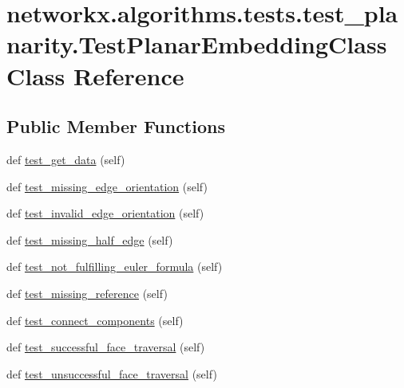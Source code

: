 \hypertarget{classnetworkx_1_1algorithms_1_1tests_1_1test__planarity_1_1TestPlanarEmbeddingClass}{}\section{networkx.\+algorithms.\+tests.\+test\+\_\+planarity.\+Test\+Planar\+Embedding\+Class Class Reference}
\label{classnetworkx_1_1algorithms_1_1tests_1_1test__planarity_1_1TestPlanarEmbeddingClass}
\subsection*{Public Member Functions}
\begin{DoxyCompactItemize}
\item 
def \hyperlink{classnetworkx_1_1algorithms_1_1tests_1_1test__planarity_1_1TestPlanarEmbeddingClass_a0e9eab283bbd20f2d41a0051b403fab6}{test\+\_\+get\+\_\+data} (self)
\item 
def \hyperlink{classnetworkx_1_1algorithms_1_1tests_1_1test__planarity_1_1TestPlanarEmbeddingClass_a01d25c12c90abe59b525d67b64c929c0}{test\+\_\+missing\+\_\+edge\+\_\+orientation} (self)
\item 
def \hyperlink{classnetworkx_1_1algorithms_1_1tests_1_1test__planarity_1_1TestPlanarEmbeddingClass_abc14804f27676db8cb703631da720133}{test\+\_\+invalid\+\_\+edge\+\_\+orientation} (self)
\item 
def \hyperlink{classnetworkx_1_1algorithms_1_1tests_1_1test__planarity_1_1TestPlanarEmbeddingClass_ad9aa4e04efa9c770f4dc1e94fad16c0d}{test\+\_\+missing\+\_\+half\+\_\+edge} (self)
\item 
def \hyperlink{classnetworkx_1_1algorithms_1_1tests_1_1test__planarity_1_1TestPlanarEmbeddingClass_adab10d3c28f221180540b7974bca3681}{test\+\_\+not\+\_\+fulfilling\+\_\+euler\+\_\+formula} (self)
\item 
def \hyperlink{classnetworkx_1_1algorithms_1_1tests_1_1test__planarity_1_1TestPlanarEmbeddingClass_a1369032e6796d5bf911cc1f13303dfaf}{test\+\_\+missing\+\_\+reference} (self)
\item 
def \hyperlink{classnetworkx_1_1algorithms_1_1tests_1_1test__planarity_1_1TestPlanarEmbeddingClass_a8e04b0091dd0bf27286c7de0eac91516}{test\+\_\+connect\+\_\+components} (self)
\item 
def \hyperlink{classnetworkx_1_1algorithms_1_1tests_1_1test__planarity_1_1TestPlanarEmbeddingClass_a459883d161a60f5360f892ab5e09bc3d}{test\+\_\+successful\+\_\+face\+\_\+traversal} (self)
\item 
def \hyperlink{classnetworkx_1_1algorithms_1_1tests_1_1test__planarity_1_1TestPlanarEmbeddingClass_a569d8cc45c779a53f616697c20330037}{test\+\_\+unsuccessful\+\_\+face\+\_\+traversal} (self)
\end{DoxyCompactItemize}
